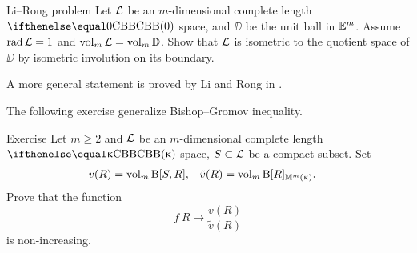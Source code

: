 \begin{thm}{Li--Rong problem}
Let $\mathcal{L}$ be an $m$-dimensional complete length $\Alex0$ space,
and $\DD$ be the unit ball in $\mathbb{E}^m$.
Assume $\mathop{\rm rad}\nolimits\mathcal{L}=1$ and $\mathop{\rm vol}\nolimits_m\mathcal{L}=\mathop{\rm vol}\nolimits_m\mathbb{D}$.
Show that $\mathcal{L}$ is isometric to the quotient space of  $\DD$ 
by isometric involution on its boundary.
\end{thm}

A more general statement is proved by Li and Rong in \cite{li-rong}.

The following exercise generalize Bishop--Gromov inequality.

\begin{thm}{Exercise}\label{thm:bishop-gromov-gen}
Let $m\ge 2$ and 
$\mathcal{L}$ be an $m$-dimensional complete length $\Alex\kappa$ space, 
$S\subset \spc{L}$ be a compact subset.
Set
\begin{align*}
v(R)&=\mathop{\rm vol}\nolimits_m\mathrm{B}{}[S,R],
&
\tilde v(R)&=\mathop{\rm vol}\nolimits_m\mathrm{B}{}[R]_{\mathbb{M}_{{}}^{m}({\upkappa})}.
\end{align*}
Prove that the function
\[f\:R\mapsto \frac{v(R)}{\tilde v(R)}\] 
is non-increasing.
\end{thm}
